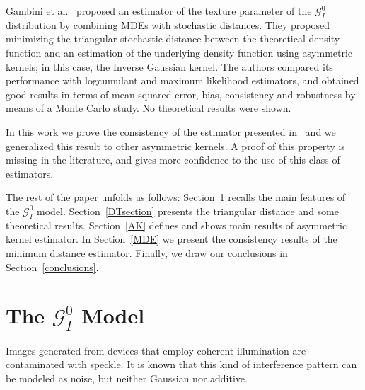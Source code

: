 \documentclass[technote,onecolumn,draftcls,12pt]{IEEEtran}
\numberwithin{equation}{section}
\begin{document}


Gambini et al.~\cite{gambini2015} proposed an estimator of the texture parameter of the $\mathcal{G}_I^0$ distribution by combining MDEs with stochastic distances. 
They proposed minimizing the triangular stochastic distance between the theoretical density function and an estimation of the underlying density function using asymmetric kernels; in this case, the Inverse Gaussian kernel. 
The authors compared its performance with logcumulant and maximum likelihood estimators, and obtained good results in terms of mean squared error, bias, consistency and robustness by means of a Monte Carlo study. 
No theoretical results were shown.

In this work we prove the consistency of the estimator presented in~\cite{gambini2015} and we generalized this result to other asymmetric kernels.
A proof of this property is missing in the literature, and gives more confidence to the use of this class of estimators.

The rest of the paper unfolds as follows: 
Section~\ref{sec_SAR} recalls the main features of the $\mathcal{G}_I^0$ model.
Section~\ref{DTsection} presents the triangular distance and some theoretical results. 
Section~\ref{AK} defines and shows main results of asymmetric kernel estimator.
In Section~\ref{MDE} we present the consistency results of the minimum distance estimator. 
Finally, we draw our conclusions in Section~\ref{conclusions}.

\section{The $\mathcal{G}_I^0$ Model}
\label{sec_SAR}
Images generated from devices that employ coherent illumination are contaminated with speckle. 
It is known that this kind of interference pattern can be modeled as noise, but neither Gaussian nor additive. 
\end{document}
